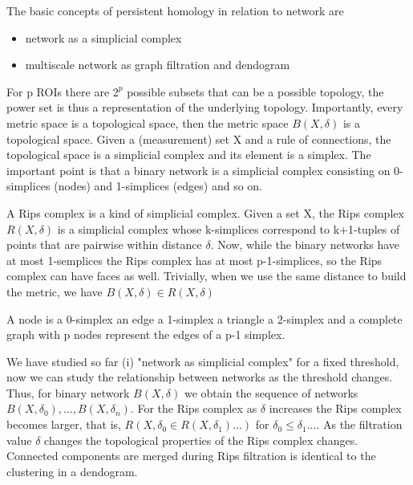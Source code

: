 \documentclass[onecollarge,runningheads]{svjour2}
\begin{document}
The basic concepts of persistent homology in relation to network are
\begin{itemize}
\item network as a simplicial complex
\item multiscale network as graph filtration and dendogram 
\end{itemize}

For p ROIs there are $2^p$ possible subsets that can be a possible topology, the power set is thus a representation of the underlying topology.
Importantly, every metric space is a topological space, then the metric space $B(X, \delta)$ is a topological space. 
Given a (measurement) set X and a rule of connections, the topological space is a simplicial complex and its element is a simplex. %
The important point is that a binary network is a simplicial complex consisting on 0-simplices (nodes) and 1-simplices (edges) and so on.

A Rips complex is a kind of simplicial complex. Given a set X, the Rips complex $R(X,\delta)$ is a simplicial complex whose k-simplices correspond to k+1-tuples of points that are pairwise within distance $\delta$. 
Now, while the binary networks have at most 1-semplices the Rips complex has at most p-1-simplices, so the Rips complex can have faces as well. Trivially, when we use the same distance to build the metric, we have $B(X,\delta) \in R(X,\delta)$

A node is a 0-simplex an edge a 1-simplex a triangle a 2-simplex and a complete graph with p nodes represent the edges of a p-1 simplex.

We have studied so far (i) "network as simplicial complex" for a fixed threshold, now we can study the relationship between networks as the threshold changes. Thus, for  binary network $B(X,\delta)$ we obtain the sequence of networks $B(X,\delta_0), ...,B(X,\delta_n)$. For the Rips complex as $\delta$ increases the Rips complex becomes larger, that is, $R(X,\delta_0 \in R(X,\delta_1) ...)$ for $\delta_0 \leq \delta_1 ...$. As the filtration value $\delta$ changes the topological properties of the Rips complex changes. Connected components are merged during Rips filtration is identical to the clustering in a dendogram.
\end{document}
